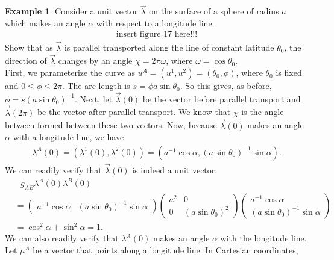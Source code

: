 \documentclass{article}
\theoremstyle{definition}
\newtheorem{exmp}{Example}[section]
\begin{document}
\begin{exmp}
	Consider a unit vector $\vec{\lambda}$ on the surface of a sphere of radius $a$ which makes an angle $\alpha$ with respect to a longitude line. 
	\begin{align*}
	\text{insert figure 17 here!!!}
	\end{align*}
	Show that as $\vec{\lambda}$ is parallel transported along the line of constant latitude $\theta_0$, the direction of $\vec{\lambda}$ changes by an angle $\chi = 2\pi \omega$, where $\omega = \cos\theta_0$. \\
	
	First, we parameterize the curve as $u^A = (u^1,u^2) = (\theta_0, \phi)$, where $\theta_0$ is fixed and $0 \leq \phi \leq 2\pi$. The arc length is $s = \phi a\sin\theta_0$. So this gives, as before, $\phi = s\left(a\sin\theta_0 \right)^{-1}$. Next, let $\vec{\lambda}(0)$ be the vector before parallel transport and $\vec{\lambda}(2\pi)$ be the vector after parallel transport. We know that $\chi$ is the angle between formed between these two vectors. Now, because $\vec{\lambda}(0)$ makes an angle $\alpha$ with a longitude line, we have
	\begin{align*}
	\lambda^A(0) = \left( \lambda^1(0),\lambda^2(0)\right) = \left(a^{-1}\cos\alpha, \left( a\sin\theta_0\right)^{-1}\sin\alpha  \right).
	\end{align*}
	We can readily verify that $\vec{\lambda}(0)$ is indeed a unit vector:
	\begin{align*}
	&\text{ }g_{AB}\lambda^A(0)\lambda^B(0)\\
	 &= 
	\begin{pmatrix}
	a^{-1}\cos\alpha & \left(a\sin\theta_0 \right)^{-1}\sin\alpha 
	\end{pmatrix}
	\begin{pmatrix}
	a^2 & 0\\
	0 & \left(a\sin\theta_0 \right)^2 
	\end{pmatrix}
	\begin{pmatrix}
	a^{-1}\cos\alpha\\
	\left( a\sin\theta_0\right)^{-1}\sin\alpha 
	\end{pmatrix}\\
	&=
	\cos^2\alpha + \sin^2\alpha = 1.
	\end{align*}
	We can also readily verify that $\lambda^A(0)$ makes an angle $\alpha$ with the longitude line. Let $\mu^A$ be a vector that points along a longitude line. In Cartesian coordinates, 
	\begin{align*}

\end{align*}
\end{exmp}
\end{document}
